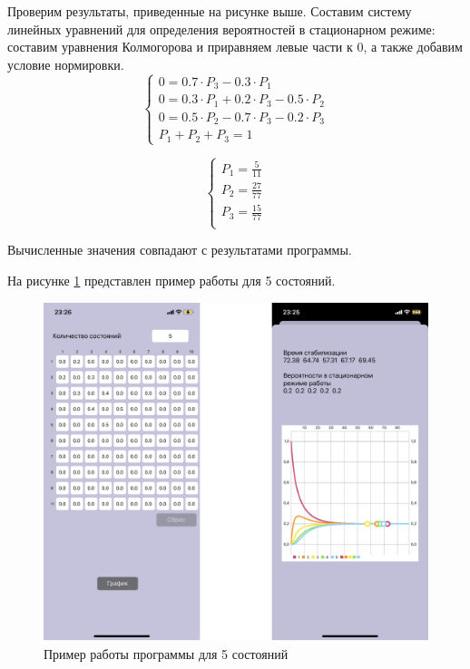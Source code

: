 \documentclass[14pt, a4paper]{extarticle}
\begin{document}
Проверим результаты, приведенные на рисунке выше. Составим систему линейных уравнений для определения вероятностей в стационарном режиме: составим уравнения Колмогорова и приравняем левые части к 0, а также добавим условие нормировки.
\begin{equation}
	\left\{\begin{array}{l}
		0 = 0.7 \cdot P_3 - 0.3 \cdot P_1 \\
		0 = 0.3 \cdot P_1 + 0.2 \cdot P_3 - 0.5 \cdot P_2 \\
		0 = 0.5 \cdot P_2 - 0.7 \cdot P_3 - 0.2 \cdot P_3 \\
		P_1 + P_2 + P_3 = 1
	\end{array}\right.
\end{equation}

\begin{equation}
	\left\{\begin{array}{l}
		P_1= \frac{5}{11} \\
		P_2 = \frac{27}{77} \\
		P_3 = \frac{15}{77} \\
	\end{array}\right.
\end{equation}

Вычисленные значения совпадают с результатами программы.


\newpage
На рисунке \ref{pic:5} представлен пример работы для 5 состояний.

\begin{figure}[h]
	\begin{center}
		{\includegraphics[scale=0.12]{pictures/5.png}
			\caption{Пример работы программы для 5 состояний}
			\label{pic:5}}
	\end{center}
\end{figure}
\end{document}
